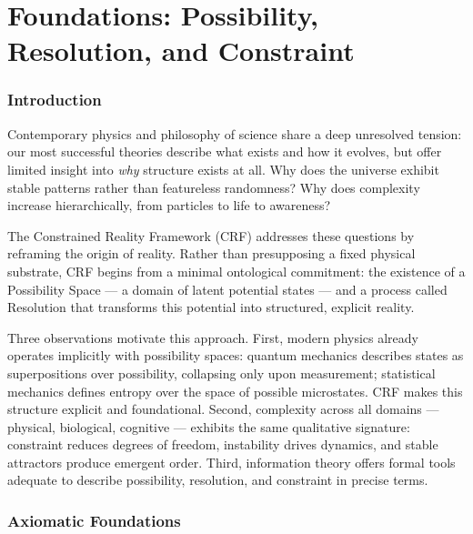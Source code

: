 \documentclass[12pt, a4paper]{article}
\begin{document}
\clearpage

\part{Foundations: Possibility, Resolution, and Constraint}

\section{Introduction}

Contemporary physics and philosophy of science share a deep unresolved tension: our most
successful theories describe what exists and how it evolves, but offer limited insight into
\emph{why} structure exists at all. Why does the universe exhibit stable patterns rather than
featureless randomness? Why does complexity increase hierarchically, from particles to life
to awareness?

The Constrained Reality Framework (CRF) addresses these questions by reframing the origin
of reality. Rather than presupposing a fixed physical substrate, CRF begins from a minimal
ontological commitment: the existence of a Possibility Space --- a domain of latent potential
states --- and a process called Resolution that transforms this potential into structured,
explicit reality.

Three observations motivate this approach. First, modern physics already operates implicitly
with possibility spaces: quantum mechanics describes states as superpositions over possibility,
collapsing only upon measurement; statistical mechanics defines entropy over the space of
possible microstates. CRF makes this structure explicit and foundational. Second, complexity
across all domains --- physical, biological, cognitive --- exhibits the same qualitative
signature: constraint reduces degrees of freedom, instability drives dynamics, and stable
attractors produce emergent order. Third, information theory offers formal tools adequate to
describe possibility, resolution, and constraint in precise terms.

\section{Axiomatic Foundations}
\end{document}
